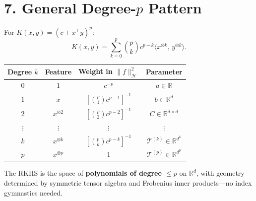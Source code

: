 \documentclass[11pt]{article}
\begin{document}
\section*{7. General Degree-$p$ Pattern}
 
For $K(x,y) = (c + x^\top y)^{p}$:
\[
  K(x,y)
  = \sum_{k=0}^{p} \binom{p}{k} c^{p-k}
    \langle x^{\otimes k},\, y^{\otimes k} \rangle.
\]
 
\medskip
\begin{center}
\begin{tabular}{cccc}
\toprule
Degree $k$ & Feature & Weight in $\|f\|_{\mathcal{H}}^{2}$ & Parameter \\
\midrule
$0$ & $1$ & $c^{-p}$
    & $a \in \mathbb{R}$ \\[3pt]
$1$ & $x$
    & $\displaystyle \left[\binom{p}{1}c^{p-1}\right]^{-1}$
    & $b \in \mathbb{R}^{d}$ \\[10pt]
$2$ & $x^{\otimes 2}$
    & $\displaystyle \left[\binom{p}{2}c^{p-2}\right]^{-1}$
    & $C \in \mathbb{R}^{d \times d}$ \\[10pt]
$\vdots$ & $\vdots$ & $\vdots$ & $\vdots$ \\[3pt]
$k$ & $x^{\otimes k}$
    & $\displaystyle \left[\binom{p}{k}c^{p-k}\right]^{-1}$
    & $\mathcal{T}^{(k)} \in \mathbb{R}^{d^{k}}$ \\[10pt]
$p$ & $x^{\otimes p}$ & $1$
    & $\mathcal{T}^{(p)} \in \mathbb{R}^{d^{p}}$ \\
\bottomrule
\end{tabular}
\end{center}
 
\medskip
The RKHS is the space of \textbf{polynomials of degree $\leq p$} on
$\mathbb{R}^{d}$, with geometry determined by symmetric tensor algebra
and Frobenius inner products---no index gymnastics needed.
 
\end{document}
